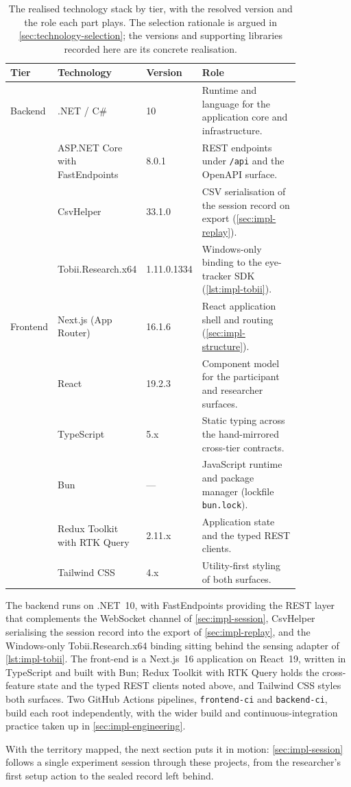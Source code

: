 \begin{table}[htbp]
\centering
\caption[The realised technology stack by tier.]{The realised technology stack by tier, with the resolved version and the role each part plays. The selection rationale is argued in \cref{sec:technology-selection}; the versions and supporting libraries recorded here are its concrete realisation.}
\label{tab:impl-stack}
\small
\setlength{\tabcolsep}{4pt}
\renewcommand{\arraystretch}{1.2}
\begin{tabular}{p{0.12\linewidth} p{0.25\linewidth} p{0.11\linewidth} p{0.36\linewidth}}
\toprule
\textbf{Tier} & \textbf{Technology} & \textbf{Version} & \textbf{Role} \\
\midrule
Backend & .NET / C\# & 10 & Runtime and language for the application core and infrastructure. \\
 & ASP.NET Core with \mbox{FastEndpoints} & 8.0.1 & REST endpoints under \texttt{/api} and the OpenAPI surface. \\
 & CsvHelper & 33.1.0 & CSV serialisation of the session record on export (\cref{sec:impl-replay}). \\
 & Tobii.Research.x64 & 1.11.0.1334 & Windows-only binding to the eye-tracker SDK (\cref{lst:impl-tobii}). \\
\addlinespace
Frontend & Next.js (App Router) & 16.1.6 & React application shell and routing (\cref{sec:impl-structure}). \\
 & React & 19.2.3 & Component model for the participant and researcher surfaces. \\
 & TypeScript & 5.x & Static typing across the hand-mirrored cross-tier contracts. \\
 & Bun & --- & JavaScript runtime and package manager (lockfile \texttt{bun.lock}). \\
 & Redux Toolkit with RTK Query & 2.11.x & Application state and the typed REST clients. \\
 & Tailwind CSS & 4.x & Utility-first styling of both surfaces. \\
\bottomrule
\end{tabular}
\end{table}

The backend runs on .NET~10, with FastEndpoints providing the REST layer that complements the WebSocket channel of \cref{sec:impl-session}, CsvHelper serialising the session record into the export of \cref{sec:impl-replay}, and the Windows-only Tobii.Research.x64 binding sitting behind the sensing adapter of \cref{lst:impl-tobii}.
The front-end is a Next.js~16 application on React~19, written in TypeScript and built with Bun; Redux Toolkit with RTK Query holds the cross-feature state and the typed REST clients noted above, and Tailwind CSS styles both surfaces.
Two GitHub Actions pipelines, \texttt{frontend-ci} and \texttt{backend-ci}, build each root independently, with the wider build and continuous-integration practice taken up in \cref{sec:impl-engineering}.

With the territory mapped, the next section puts it in motion: \cref{sec:impl-session} follows a single experiment session through these projects, from the researcher's first setup action to the sealed record left behind.
